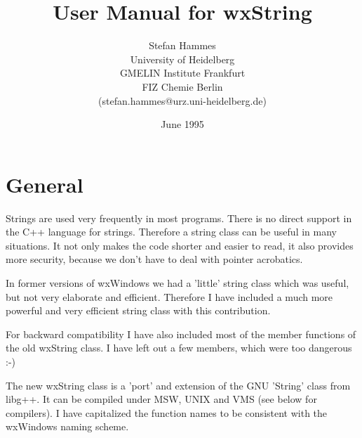 
 
\parindent 0pt
\parskip 11pt
%
\title{User Manual for wxString}
\author{Stefan Hammes\\University of Heidelberg\\GMELIN Institute Frankfurt\\FIZ Chemie Berlin\\(stefan.hammes@urz.uni-heidelberg.de)}
\date{June 1995}
\makeindex

\maketitle
%
\pagestyle{fancyplain}

\setfooter{\thepage}{}{}{}{}{\thepage}
\tableofcontents%
\newpage%
%

\chapter{General}


Strings are used very frequently in most programs. There is no direct support in
the C++ language for strings. Therefore a string class can be useful in many
situations. It not only makes the code shorter and easier to read, it also
provides more security, because we don't have to deal with pointer acrobatics.

In former versions of wxWindows we had a 'little' string class which was useful,
but not very elaborate and efficient. Therefore I have included a much more
powerful and very efficient string class with this contribution.

For backward compatibility I have also included most of the member functions
of the old wxString class. I have left out a few members, which were too
dangerous :-)

The new wxString class is a 'port' and extension of the GNU 'String' 
class from libg++. It can be compiled under MSW, UNIX and VMS 
(see below for compilers). 
I have capitalized the function names to be consistent with
the wxWindows naming scheme.

